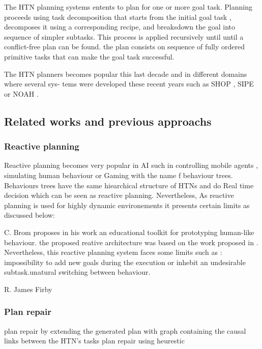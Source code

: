 \documentclass[conference]{IEEEtran}
\begin{document}
\par The HTN planning systems entents to plan for one or more goal task. Planning proceeds using task decomposition that starts from the initial goal task , decomposes it using a corresponding recipe, and breaksdown the goal into sequence of simpler subtasks. This process is applied recursively until until a conflict-free plan can be found. the plan consists on sequence of fully ordered primitive tasks that can make the goal task successful. 
\par The HTN planners becomes popular this last decade and in different domains where several sys-
tems were developed these recent years such as SHOP \cite{nau1999shop}, SIPE \cite{wilkins1988practical} or NOAH  \cite{sacerdoti1975structure}.



\subsection{Related works and previous approachs}

	\subsubsection{Reactive planning}
  Reactive planning becomes very popular in AI such in controlling mobile agents \cite{beaudry2005reactive}, simulating human behaviour \cite{bryson2001modularity} or Gaming with the name f behaviour trees. Behaviours trees have the same hiearchical structure of HTNs and do Real time decision which can be seen as reactive planning.
   Nevertheless, As reactive planning is used for highly dynamic environements it presents certain limits as discussed below: 

  C. Brom \cite{brom2005hierarchical} proposes in his work an educational toolkit for prototyping human-like behaviour. the proposed reative architecture was based on the work proposed in \cite{bryson2001modularity}. Nevertheless, this reactive planning system faces some limits such as : 
 impossibility to add new goals during the execution or inhebit an undesirable subtask.unatural switching between behaviour. 
  
  R. James Firby  \cite{firby1987investigation} 
  

 \subsubsection{Plan repair}
 	 plan repair by extending the generated plan with graph containing the causal links between the HTN's tasks
 	 \cite{ayan2007hotride}  \cite{warfield2007adaptation} \cite{van2005plan} \cite{boella2002replanning}
 	  plan repair using heurestic \cite{hayashi2006dynagent}
\end{document}
